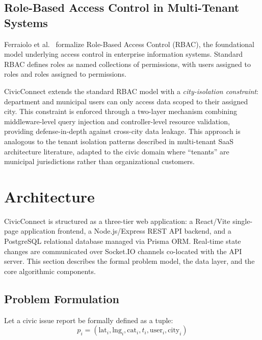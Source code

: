 \documentclass[conference]{IEEEtran}
\begin{document}
\subsection{Role-Based Access Control in Multi-Tenant Systems}

Ferraiolo et al.~\cite{b8} formalize Role-Based Access Control (RBAC), the foundational model underlying access control in enterprise information systems. Standard RBAC defines roles as named collections of permissions, with users assigned to roles and roles assigned to permissions.

CivicConnect extends the standard RBAC model with a \textit{city-isolation constraint}: department and municipal users can only access data scoped to their assigned city. This constraint is enforced through a two-layer mechanism combining middleware-level query injection and controller-level resource validation, providing defense-in-depth against cross-city data leakage. This approach is analogous to the tenant isolation patterns described in multi-tenant SaaS architecture literature, adapted to the civic domain where ``tenants'' are municipal jurisdictions rather than organizational customers.

\section{Architecture}

CivicConnect is structured as a three-tier web application: a React/Vite single-page application frontend, a Node.js/Express REST API backend, and a PostgreSQL relational database managed via Prisma ORM. Real-time state changes are communicated over Socket.IO channels co-located with the API server. This section describes the formal problem model, the data layer, and the core algorithmic components.

\subsection{Problem Formulation}

Let a civic issue report be formally defined as a tuple:
\begin{equation}
p_i = (\text{lat}_i, \text{lng}_i, \text{cat}_i, t_i, \text{user}_i, \text{city}_i)
\label{eq:tuple}
\end{equation}
\end{document}
